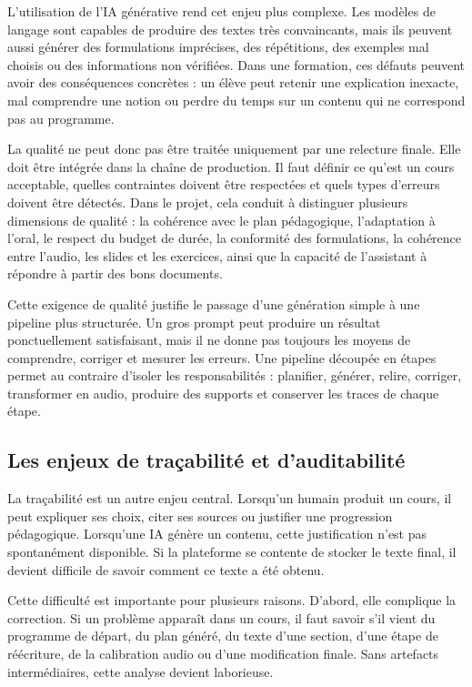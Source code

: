 L'utilisation de l'IA générative rend cet enjeu plus complexe. Les modèles de langage sont
capables de produire des textes très convaincants, mais ils peuvent aussi générer des
formulations imprécises, des répétitions, des exemples mal choisis ou des informations
non vérifiées. Dans une formation, ces défauts peuvent avoir des conséquences concrètes :
un élève peut retenir une explication inexacte, mal comprendre une notion ou perdre du
temps sur un contenu qui ne correspond pas au programme.

La qualité ne peut donc pas être traitée uniquement par une relecture finale. Elle doit
être intégrée dans la chaîne de production. Il faut définir ce qu'est un cours acceptable,
quelles contraintes doivent être respectées et quels types d'erreurs doivent être détectés.
Dans le projet, cela conduit à distinguer plusieurs dimensions de qualité : la cohérence
avec le plan pédagogique, l'adaptation à l'oral, le respect du budget de durée, la
conformité des formulations, la cohérence entre l'audio, les slides et les exercices, ainsi
que la capacité de l'assistant à répondre à partir des bons documents.

Cette exigence de qualité justifie le passage d'une génération simple à une pipeline plus
structurée. Un gros prompt peut produire un résultat ponctuellement satisfaisant, mais il
ne donne pas toujours les moyens de comprendre, corriger et mesurer les erreurs. Une
pipeline découpée en étapes permet au contraire d'isoler les responsabilités : planifier,
générer, relire, corriger, transformer en audio, produire des supports et conserver les
traces de chaque étape.

\subsection{Les enjeux de traçabilité et d'auditabilité}

La traçabilité est un autre enjeu central. Lorsqu'un humain produit un cours, il peut
expliquer ses choix, citer ses sources ou justifier une progression pédagogique. Lorsqu'une
IA génère un contenu, cette justification n'est pas spontanément disponible. Si la
plateforme se contente de stocker le texte final, il devient difficile de savoir comment ce
texte a été obtenu.

Cette difficulté est importante pour plusieurs raisons. D'abord, elle complique la
correction. Si un problème apparaît dans un cours, il faut savoir s'il vient du programme
de départ, du plan généré, du texte d'une section, d'une étape de réécriture, de la
calibration audio ou d'une modification finale. Sans artefacts intermédiaires, cette analyse
devient laborieuse.

